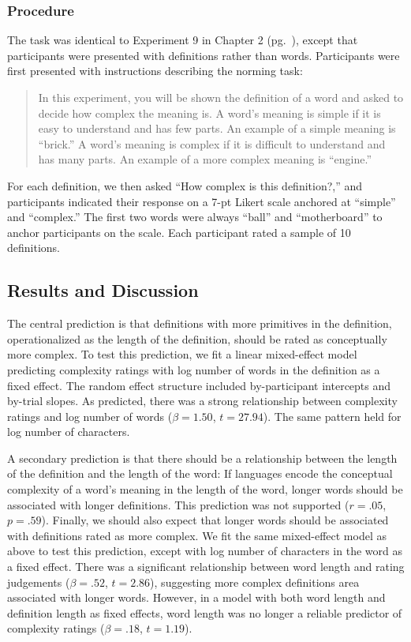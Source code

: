 \subsubsection{Procedure}
The task was identical to Experiment 9 in Chapter 2 (pg.\ \pageref{ch2-9}), except that participants were presented with definitions rather than words. Participants were first presented with instructions describing the norming task:
\begin{quote}
In this experiment, you will be shown the definition of a word and asked to decide how complex the meaning is. A word's meaning is simple if it is easy to understand and has few parts. An example of a simple meaning is ``brick.'' A word's meaning is complex if it is difficult to understand and has many parts. An example of a more complex meaning is ``engine.''
\end{quote}
For each definition, we then asked ``How complex is this definition?,'' and participants indicated their response on a 7-pt Likert scale anchored at ``simple'' and ``complex.'' The first two words were always ``ball'' and ``motherboard'' to anchor participants on the scale. Each participant rated a sample of 10 definitions. 

\subsection{Results and Discussion}
The central prediction is that definitions with more primitives in the definition, operationalized as the length of the definition, should be rated as conceptually more complex. To test this prediction, we fit a linear mixed-effect model predicting complexity ratings with log number of words in the definition as a fixed effect. The random effect structure included by-participant intercepts and by-trial slopes. As predicted, there was a strong relationship between complexity ratings and log number of words ($\beta=1.50$, $t =27.94$). The same pattern held for log number of characters.

A secondary prediction is that there should be a relationship between the length of the definition and the length of the word: If languages encode the conceptual complexity of a word's meaning in the length of the word, longer words should be associated with longer definitions. This prediction was not supported ($r=.05$, $p =.59$). Finally, we should also expect that  longer words should be associated with definitions rated as more complex. We fit the same mixed-effect model as above to test this prediction, except with log number of characters in the word as a fixed effect. There was a significant relationship between word length and rating judgements ($\beta=.52$, $t =2.86$), suggesting more complex definitions area associated with longer words. However, in a model with both word length and definition length as fixed effects, word length was no longer a reliable predictor of complexity ratings ($\beta=.18$, $t =1.19$).

